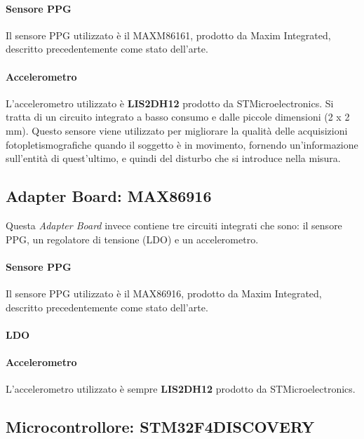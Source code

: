 \paragraph{Sensore PPG} Il sensore PPG utilizzato è il MAXM86161, prodotto da Maxim Integrated, descritto precedentemente come stato dell'arte.

\paragraph{Accelerometro} L'accelerometro utilizzato è \textbf{LIS2DH12} prodotto da STMicroelectronics. Si tratta di un circuito integrato a basso consumo e dalle piccole dimensioni (2 x 2 mm). Questo sensore viene utilizzato per migliorare la qualità delle acquisizioni fotopletismografiche quando il soggetto è in movimento, fornendo un'informazione sull'entità di quest'ultimo, e quindi del disturbo che si introduce nella misura. 

\subsection{Adapter Board: MAX86916}
Questa \textit{Adapter Board} invece contiene tre circuiti integrati che sono: il sensore PPG, un regolatore di tensione (LDO) e un accelerometro.

\paragraph{Sensore PPG} Il sensore PPG utilizzato è il MAX86916, prodotto da Maxim Integrated, descritto precedentemente come stato dell'arte.

\paragraph{LDO} 

\paragraph{Accelerometro} L'accelerometro utilizzato è sempre \textbf{LIS2DH12} prodotto da STMicroelectronics.

\subsection{Microcontrollore: STM32F4DISCOVERY}